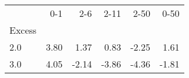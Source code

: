 \begin{tabular}{lrrrrr}
\toprule
{} &   0-1 &   2-6 &  2-11 &  2-50 &  0-50 \\
Excess &       &       &       &       &       \\
\midrule
2.0    &  3.80 &  1.37 &  0.83 & -2.25 &  1.61 \\
3.0    &  4.05 & -2.14 & -3.86 & -4.36 & -1.81 \\
\bottomrule
\end{tabular}
